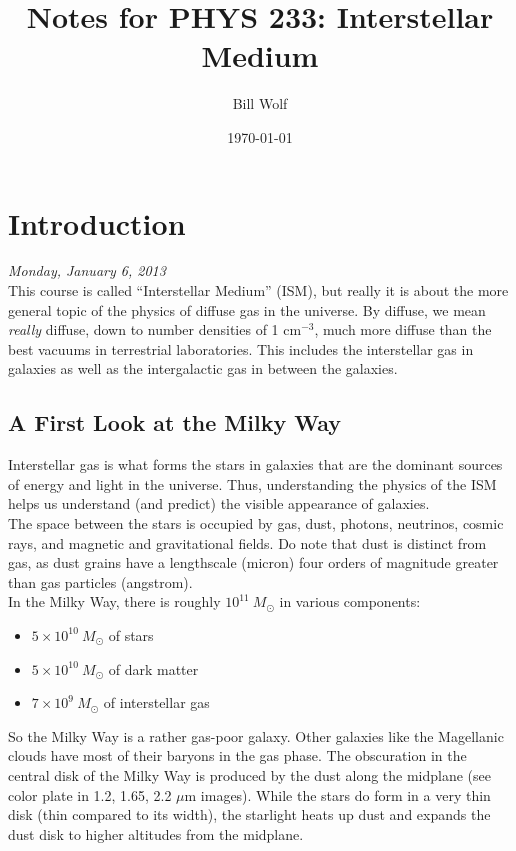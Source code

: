 \documentclass[10pt]{article}
\title{Notes for PHYS 233: Interstellar Medium}
\author{Bill Wolf}
\date{\today}
\numberwithin{equation}{section}
\newcommand{\n}{\noindent}
\begin{document}
\vfill\maketitle\vfill \newpage

\tableofcontents \newpage

\section{Introduction}
\emph{Monday, January 6, 2013}\\

\n This course is called ``Interstellar Medium'' (ISM), but really it is about the more general topic of the physics of diffuse gas in the universe. By diffuse, we mean \emph{really} diffuse, down to number densities of 1 cm$^{-3}$, much more diffuse than the best vacuums in terrestrial laboratories. This includes the interstellar gas in galaxies as well as the intergalactic gas in between the galaxies.\\

\subsection{A First Look at the Milky Way} %
\label{sub:a_first_look}
Interstellar gas is what forms the stars in galaxies that are the dominant sources of energy and light in the universe. Thus, understanding the physics of the ISM helps us understand (and predict) the visible appearance of galaxies.\\

\noindent The space between the stars is occupied by gas, dust, photons, neutrinos, cosmic rays, and magnetic and gravitational fields. Do note that dust is distinct from gas, as dust grains have a lengthscale (micron) four orders of magnitude greater than gas particles (angstrom).\\

\noindent In the Milky Way, there is roughly $10^{11}\ M_\odot$ in various components:
\begin{itemize}
  \item $5\times 10^{10}\ M_\odot$ of stars
  \item $5\times 10^{10}\ M_\odot$ of dark matter
  \item $7\times 10^{9}\ M_\odot$ of interstellar gas
\end{itemize}
So the Milky Way is a rather gas-poor galaxy. Other galaxies like the Magellanic clouds have most of their baryons in the gas phase. The obscuration in the central disk of the Milky Way is produced by the dust along the midplane (see color plate in 1.2, 1.65, 2.2 $\mu$m images). While the stars do form in a very thin disk (thin compared to its width), the starlight heats up dust and expands the dust disk to higher altitudes from the midplane.\\
\end{document}
